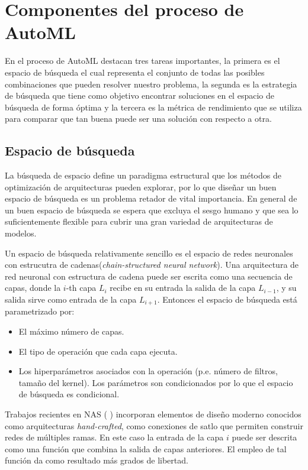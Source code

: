 \section{Componentes del proceso de AutoML}
En el proceso de AutoML destacan tres tareas importantes, la primera es el espacio de búsqueda el cual representa el conjunto de todas las posibles combinaciones que pueden resolver nuestro problema, la segunda es la estrategia de búsqueda que tiene como objetivo encontrar soluciones en el espacio de búsqueda de forma óptima y la tercera es la métrica de rendimiento que se utiliza para comparar que tan buena puede ser una solución con respecto a otra.

\subsection{Espacio de búsqueda}
La búsqueda de espacio define un paradigma estructural que los métodos de optimización de arquitecturas pueden explorar, por lo que diseñar un buen espacio de búsqueda es un problema retador de vital importancia. En general de un buen espacio de búsqueda se espera que excluya el sesgo humano y que sea lo suficientemente flexible para cubrir una gran variedad de arquitecturas de modelos.

Un espacio de búsqueda relativamente sencillo es el espacio de redes neuronales con estrucutra de cadenas(\textit{chain-structured neural network}). Una arquitectura de red neuronal con estructura de cadena puede ser escrita como una secuencia de capas, donde la $i$-th capa $L_i$ recibe en su entrada la salida de la capa $L_{i-1}$, y su salida sirve como entrada de la capa $L_{i + 1}$. Entonces el espacio de búsqueda está parametrizado por:

\begin{itemize}
\item El máximo número de capas.
\item El tipo de operación que cada capa ejecuta.
\item Los hiperparámetros asociados con la operación (p.e. número de filtros, tamaño del kernel). Los parámetros son condicionados por lo que el espacio de búsqueda es condicional.
\end{itemize}

Trabajos recientes en NAS (\parencite{56} \parencite{65} \parencite{66} \parencite{67} \parencite{68}) incorporan elementos de diseño moderno conocidos como arquitecturas \textit{hand-crafted}, como conexiones de satlo que permiten construir redes de múltiples ramas. En este caso la entrada de la capa $i$ puede ser descrita como una función que combina la salida de capas anteriores. El empleo de tal función da como resultado más grados de libertad.\\

